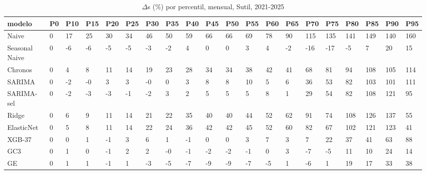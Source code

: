 \begin{table}[H]
\centering
\small
\caption{$\Delta$s (\%) por percentil, mensual, Sutil, 2021-2025}
\label{tab:T_barrido_delta_s_mensual_sutil}
\begin{tabular}{llllllllllllllllllll}
\toprule
modelo & P0 & P10 & P15 & P20 & P25 & P30 & P35 & P40 & P45 & P50 & P55 & P60 & P65 & P70 & P75 & P80 & P85 & P90 & P95 \\
\midrule
Naive & 0 & 17 & 25 & 30 & 34 & 46 & 50 & 59 & 66 & 66 & 69 & 78 & 90 & 115 & 135 & 141 & 149 & 140 & 160 \\
Seasonal Naive & 0 & -6 & -6 & -5 & -5 & -3 & -2 & 4 & 0 & 0 & 3 & 4 & -2 & -16 & -17 & -5 & 7 & 20 & 15 \\
Chronos & 0 & 4 & 8 & 11 & 14 & 19 & 23 & 28 & 34 & 34 & 38 & 42 & 41 & 68 & 81 & 94 & 108 & 105 & 114 \\
SARIMA & 0 & -2 & -0 & 3 & 3 & -0 & 0 & 3 & 8 & 8 & 10 & 5 & 6 & 36 & 53 & 82 & 103 & 101 & 111 \\
SARIMA-sel & 0 & -2 & -3 & -3 & -1 & -2 & 3 & 2 & 5 & 5 & 5 & 8 & 1 & 29 & 54 & 82 & 108 & 121 & 95 \\
Ridge & 0 & 6 & 9 & 11 & 14 & 21 & 22 & 35 & 40 & 40 & 44 & 52 & 62 & 91 & 74 & 108 & 126 & 137 & 55 \\
ElasticNet & 0 & 5 & 8 & 11 & 14 & 22 & 24 & 36 & 42 & 42 & 45 & 52 & 60 & 82 & 67 & 102 & 121 & 123 & 41 \\
XGB-37 & 0 & 0 & 1 & -1 & 3 & 6 & 1 & -1 & 0 & 0 & 3 & 7 & 3 & 7 & 22 & 37 & 41 & 63 & 88 \\
GC3 & 0 & 1 & 0 & -1 & 2 & 2 & -0 & -1 & -2 & -2 & -1 & 0 & 3 & -7 & -5 & 11 & 10 & 24 & 14 \\
GE & 0 & 1 & 1 & -1 & 1 & -3 & -5 & -7 & -9 & -9 & -7 & -5 & 1 & -6 & 1 & 19 & 17 & 33 & 38 \\
\bottomrule
\end{tabular}
\end{table}